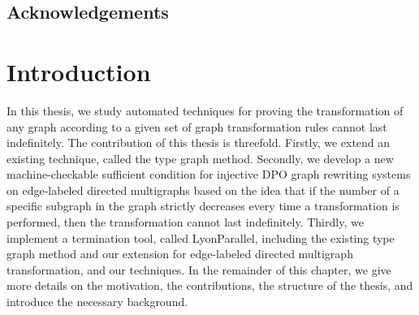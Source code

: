 \documentclass{report}
\begin{document}
  
  
  
 
\section*{Acknowledgements}

\newpage       

 
\tableofcontents  
\newpage      
  
\chapter{Introduction}
In this thesis, we study automated techniques for proving the transformation of any graph according to a given set of graph transformation rules cannot last indefinitely.
 The contribution of this thesis is threefold. 
 Firstly, we extend an existing technique, called the type graph method.
   Secondly, we develop a new machine-checkable sufficient condition 
   for injective DPO graph rewriting systems on edge-labeled directed multigraphs based on the idea that if the number of a specific subgraph in the graph strictly decreases every time a transformation is performed, then the transformation cannot last indefinitely.
    Thirdly, we implement a termination tool, called LyonParallel, including the existing 
    type graph method and our extension for edge-labeled directed multigraph transformation, and our techniques. In the remainder of this chapter, we give more details on the motivation, the contributions, the structure of the thesis, and introduce the necessary background.
\end{document}
